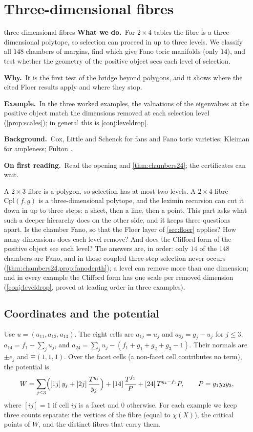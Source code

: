 \documentclass[11pt]{article}
\theoremstyle{definition}\newtheorem{definition}[theorem]{Definition}\newtheorem{remark}[theorem]{Remark}\newtheorem{example}[theorem]{Example}\newtheorem{problem}[theorem]{Open problem}\crefname{problem}{Problem}{Problems}
\newcommand{\rbwhat}{\textcolor{rbWhat}{\textbf{What we do.}}~}\newcommand{\rbwhy}{\par\smallskip\textcolor{rbWhy}{\textbf{Why.}}~}
\newcommand{\rbex}{\par\smallskip\textcolor{rbEx}{\textbf{Example.}}~}\newcommand{\rbbg}{\par\smallskip\textcolor{rbBg}{\textbf{Background.}}~}
\newcommand{\rbfirst}{\par\smallskip\textcolor{rbFirst}{\textbf{On first reading.}}~}
\begin{document}
\section{Three-dimensional fibres}\label{sec:twofour}
\begin{readerbox}{three-dimensional fibres}
\rbwhat For $2\times4$ tables the fibre is a three-dimensional polytope, so selection can proceed in up to three levels. We classify all $148$ chambers of margins, find which give Fano toric manifolds (only $14$), and test whether the geometry of the positive object sees each level of selection.
\rbwhy It is the first test of the bridge beyond polygons, and it shows where the cited Floer results apply and where they stop.
\rbex In the three worked examples, the valuations of the eigenvalues at the positive object match the dimensions removed at each selection level (\cref{prop:scales}); in general this is \cref{conj:leveldrop}.
\rbbg Cox, Little and Schenck \cite{CLS2011} for fans and Fano toric varieties; Kleiman \cite{Kleiman1966} for ampleness; Fulton \cite{Fulton1993}.
\rbfirst Read the opening and \cref{thm:chambers24}; the certificates can wait.
\end{readerbox}
A $2\times3$ fibre is a polygon, so selection has at most two levels. A $2\times4$ fibre $\mathrm{Cpl}(f,g)$ is a three-dimensional polytope, and the leximin recursion can cut it down in up to three
steps: a sheet, then a line, then a point. This part asks what such a deeper hierarchy does on the other side, and it keeps three questions apart. Is the chamber Fano, so that the Floer layer of
\cref{sec:floer} applies? How many dimensions does each level remove? And does the Clifford form of the positive object see each level? The answers are, in order: only $14$ of the $148$ chambers are
Fano, and in those coupled three-step selection never occurs (\cref{thm:chambers24,prop:fanodepth}); a level can remove more than one dimension; and in every example the Clifford form has one scale
per removed dimension (\cref{conj:leveldrop}, proved at leading order in three examples).

\subsection{Coordinates and the potential}
Use $u=(a_{11},a_{12},a_{13})$. The eight cells are $a_{1j}=u_j$ and $a_{2j}=g_j-u_j$ for $j\le3$, $a_{14}=f_1-\sum_ju_j$, and $a_{24}=\sum_ju_j-(f_1+g_1+g_2+g_3-1)$. Their normals are $\pm e_j$ and
$\mp(1,1,1)$. Over the facet cells (a non-facet cell contributes no term), the potential is
\begin{equation}\label{eq:W24}
W=\sum_{j\le3}\Bigl([1j]\,y_j+[2j]\,\frac{T^{g_j}}{y_j}\Bigr)+[14]\,\frac{T^{f_1}}{P}+[24]\,T^{g_4-f_1}P,\qquad P=y_1y_2y_3,
\end{equation}
where $[ij]=1$ if cell $ij$ is a facet and $0$ otherwise. For each example we keep three counts separate: the vertices of the fibre (equal to $\chi(X)$), the critical points of $W$, and the distinct
fibres that carry them.
\end{document}
